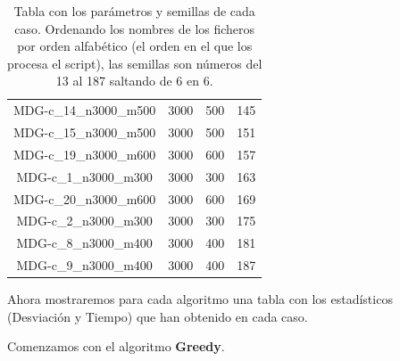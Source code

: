 \documentclass{article}
\begin{document}
\begin{table}[H]
\begin{tabular}{|cccc|}
		MDG-c\_14\_n3000\_m500 & 3000 & 500 & 145\\
		MDG-c\_15\_n3000\_m500 & 3000 & 500 & 151\\
		MDG-c\_19\_n3000\_m600 & 3000 & 600 & 157\\
		MDG-c\_1\_n3000\_m300 & 3000 & 300 & 163\\
		MDG-c\_20\_n3000\_m600 & 3000 & 600 & 169\\
		MDG-c\_2\_n3000\_m300 & 3000 & 300 & 175\\
		MDG-c\_8\_n3000\_m400 & 3000 & 400 & 181\\
		MDG-c\_9\_n3000\_m400 & 3000 & 400 & 187\\
		\hline
	\end{tabular}
\caption{Tabla con los parámetros y semillas de cada caso. Ordenando los nombres de los ficheros por orden alfabético
(el orden en el que los procesa el script), las semillas son números del 13 al 187 saltando de 6 en 6.}
\label{tab:param-seed}
\end{table}

Ahora mostraremos para cada algoritmo una tabla con los estadísticos (Desviación y Tiempo) que han obtenido en cada
caso.

\pagebreak

Comenzamos con el algoritmo \textbf{Greedy}.
\end{document}
